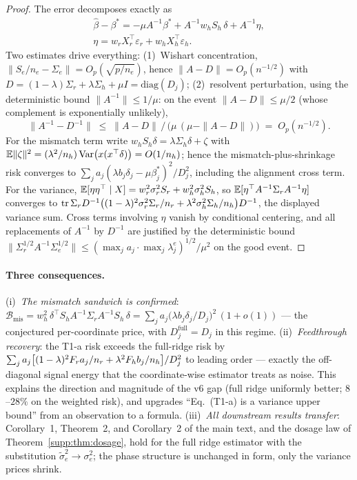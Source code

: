 \begin{proof}
The error decomposes exactly as
\begin{equation}
\begin{gathered}
\hat\beta - \beta^* = -\mu A^{-1}\beta^* + A^{-1} w_h S_h\, \delta + A^{-1}\eta,
\\[2pt]
\eta = w_r X_r^\top\varepsilon_r + w_h X_h^\top\varepsilon_h .
\end{gathered}
\end{equation}
Two estimates drive everything: (1)~Wishart concentration, $\|S_e/n_e - \Sigma_e\| = O_p(\sqrt{p/n_e})$, hence $\|A - D\| = O_p(n^{-1/2})$ with $D = (1-\lambda)\Sigma_r + \lambda\Sigma_h + \mu I = \mathrm{diag}(D_j)$; (2)~resolvent perturbation, using the deterministic bound $\|A^{-1}\| \le 1/\mu$: on the event $\|A-D\| \le \mu/2$ (whose complement is exponentially unlikely),
\begin{equation}
\|A^{-1} - D^{-1}\| \;\le\; \|A-D\|\,\big/\,\big(\mu\,(\mu-\|A-D\|)\big) \;=\; O_p(n^{-1/2}) .
\end{equation}
For the mismatch term write $w_h S_h\delta = \lambda\Sigma_h\delta + \zeta$ with $\mathbb{E}\|\zeta\|^2 = (\lambda^2/n_h)\,\mathrm{Var}\big(x(x^\top\delta)\big) = O(1/n_h)$; hence the mismatch-plus-shrinkage risk converges to $\sum_j a_j(\lambda b_j\delta_j - \mu\beta^*_j)^2/D_j^2$, including the alignment cross term.
For the variance, $\mathbb{E}[\eta\eta^\top \mid X] = w_r^2\sigma_r^2 S_r + w_h^2\sigma_h^2 S_h$, so $\mathbb{E}[\eta^\top A^{-1}\Sigma_r A^{-1}\eta]$ converges to $\mathrm{tr}\, \Sigma_r D^{-1}\big((1-\lambda)^2\sigma_r^2\Sigma_r/n_r + \lambda^2\sigma_h^2\Sigma_h/n_h\big)D^{-1}$, the displayed variance sum.
Cross terms involving $\eta$ vanish by conditional centering, and all replacements of $A^{-1}$ by $D^{-1}$ are justified by the deterministic bound $\|\Sigma_r^{1/2}A^{-1}\Sigma_e^{1/2}\| \le (\max_j a_j \cdot \max_j \lambda^e_j)^{1/2}/\mu^2$ on the good event.
\end{proof}

\paragraph{Three consequences.}
(i)~\emph{The mismatch sandwich is confirmed}: $\mathcal{B}_{\mathrm{mis}} = w_h^2\, \delta^\top S_h A^{-1} \Sigma_r A^{-1} S_h\, \delta = \sum_j a_j\big(\lambda b_j \delta_j / D_j\big)^2\,(1 + o(1))$ --- the conjectured per-coordinate price, with $D^{\mathrm{full}}_j = D_j$ in this regime.
(ii)~\emph{Feedthrough recovery}: the T1-a risk exceeds the full-ridge risk by $\sum_j a_j\big[(1-\lambda)^2 F_r a_j/n_r + \lambda^2 F_h b_j/n_h\big]/D_j^2$ to leading order --- exactly the off-diagonal signal energy that the coordinate-wise estimator treats as noise.
This explains the direction and magnitude of the v6 gap (full ridge uniformly better; $8$--$28\%$ on the weighted risk), and upgrades ``Eq.~(T1-a) is a variance upper bound'' from an observation to a formula.
(iii)~\emph{All downstream results transfer}: Corollary~1, Theorem~2, and Corollary~2 of the main text, and the dosage law of Theorem~\ref{supp:thm:dosage}, hold for the full ridge estimator with the substitution $\tilde\sigma_e^2 \to \sigma_e^2$; the phase structure is unchanged in form, only the variance prices shrink.

